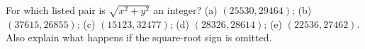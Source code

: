 For which listed pair is $\sqrt{x^2+y^2}$ an integer? (a) $(25530,29464)$; (b) $(37615,26855)$; (c) $(15123,32477)$; (d) $(28326,28614)$; (e) $(22536,27462)$. Also explain what happens if the square-root sign is omitted.
